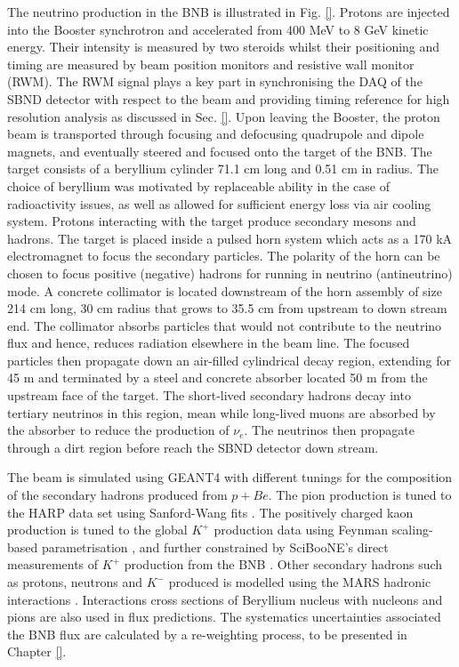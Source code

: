 The neutrino production in the BNB is illustrated in Fig. \ref{}.
Protons are injected into the Booster synchrotron and accelerated from 400 MeV to 8 GeV kinetic energy.
Their intensity is measured by two steroids whilst their positioning and timing are measured by beam position monitors and resistive wall monitor (RWM).
The RWM signal plays a key part in synchronising the DAQ of the SBND detector with respect to the beam and providing timing reference for high resolution analysis as discussed in Sec. \ref{}. 
Upon leaving the Booster, the proton beam is transported through focusing and defocusing quadrupole and dipole magnets, and eventually steered and focused onto the target of the BNB.
The target consists of a beryllium cylinder 71.1 cm long and 0.51 cm in radius. 
The choice of beryllium was motivated by replaceable ability in the case of radioactivity issues, as well as allowed for sufficient energy loss via air cooling system.
Protons interacting with the target produce secondary mesons and hadrons.
The target is placed inside a pulsed horn system which acts as a 170 kA electromagnet to focus the secondary particles.
The polarity of the horn can be chosen to focus positive (negative) hadrons for running in neutrino (antineutrino) mode.
A concrete collimator is located downstream of the horn assembly of size 214 cm long, 30 cm radius that grows to 35.5 cm from upstream to down stream end.
The collimator absorbs particles that would not contribute to the neutrino flux and hence, reduces radiation elsewhere in the beam line.
The focused particles then propagate down an air-filled cylindrical decay region, extending for 45 m and terminated by a steel and concrete absorber located 50 m from the upstream face of the target.
The short-lived secondary hadrons decay into tertiary neutrinos in this region, mean while long-lived muons are absorbed by the absorber to reduce the production of $\nu_{e}$.
The neutrinos then propagate through a dirt region before reach the SBND detector down stream.

The beam is simulated using GEANT4 with different tunings for the composition of the secondary hadrons produced from $p + Be$.
The pion production is tuned to the HARP data set using Sanford-Wang fits \cite{}.
The positively charged kaon production is tuned to the global $K^{+}$ production data using Feynman scaling-based parametrisation \cite{}, and further constrained by SciBooNE's direct measurements of $K^{+}$ production from the BNB \cite{}. 
Other secondary hadrons such as protons, neutrons and $K^{-}$ produced is modelled using the MARS hadronic interactions \cite{}. 
Interactions cross sections of Beryllium nucleus with nucleons and pions are also used in flux predictions.   
The systematics uncertainties associated the BNB flux are calculated by a re-weighting process,
to be presented in Chapter \ref{}.

